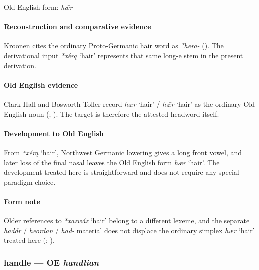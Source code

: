 \documentclass[
  british,
  a4paper,
]{article}
\providecommand{\Recon}[1]{\emph{*#1}}
\begin{document}
Old English form: \emph{hǣr}

\paragraph{Reconstruction and comparative
evidence}\label{reconstruction-and-comparative-evidence-32}

Kroonen cites the ordinary Proto-Germanic hair word as \emph{*hēra-}
(). The derivational input
\Recon{xḗrą} `hair' represents that same long-ē stem in the present
derivation.

\paragraph{Old English evidence}\label{old-english-evidence-32}

Clark Hall and Bosworth-Toller record \emph{hær} `hair' / \emph{hǣr}
`hair' as the ordinary Old English noun
(;
). The
target is therefore the attested headword itself.

\paragraph{Development to Old
English}\label{development-to-old-english-32}

From \Recon{xḗrą} `hair', Northwest Germanic lowering gives a long front
vowel, and later loss of the final nasal leaves the Old English form
\emph{hǣr} `hair'. The development treated here is straightforward and
does not require any special paradigm choice.

\paragraph{Form note}\label{form-note-5}

Older references to \Recon{xazwăz} `hair' belong to a different lexeme,
and the separate \emph{haddr} / \emph{heordan} / \emph{hād-} material
does not displace the ordinary simplex \emph{hǣr} `hair' treated here
(;
).

\subsubsection{\texorpdfstring{handle --- OE
\emph{handlian}}{handle --- OE handlian}}\label{handle-oe-handlian}
\end{document}
